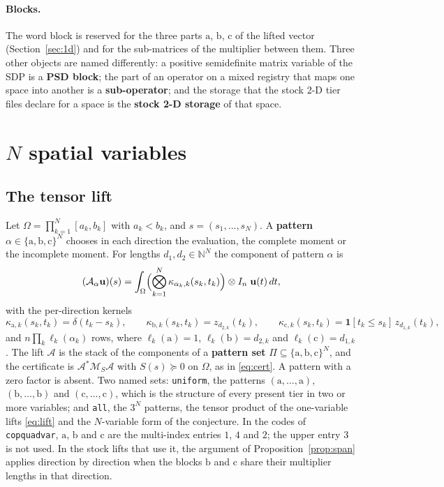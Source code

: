 \documentclass[12pt]{article}
\newcommand{\N}{\mathbb{N}}
\newcommand{\mcl}[1]{\mathcal{#1}}
\newcommand{\mbf}[1]{\mathbf{#1}}
\newcommand{\code}[1]{\texttt{#1}}
\newcommand{\ba}{\mathrm{a}}
\newcommand{\bb}{\mathrm{b}}
\newcommand{\bc}{\mathrm{c}}
\theoremstyle{plain}
\theoremstyle{definition}
\theoremstyle{remark}
\begin{document}
\paragraph{Blocks.} The word block is reserved for the three parts $\ba$, $\bb$, $\bc$ of the lifted vector (Section~\ref{sec:1d}) and for the sub-matrices of the multiplier between them. Three other objects are named differently: a positive semidefinite matrix variable of the SDP is a \textbf{PSD block}; the part of an operator on a mixed registry that maps one space into another is a \textbf{sub-operator}; and the storage that the stock 2-D tier files declare for a space is the \textbf{stock 2-D storage} of that space.

\section{$N$ spatial variables}\label{sec:nd}

\subsection{The tensor lift}\label{sec:tensor}

Let $\Omega=\prod_{k=1}^N[a_k,b_k]$ with $a_k<b_k$, and $s=(s_1,\dots,s_N)$. A \textbf{pattern} $\alpha\in\{\ba,\bb,\bc\}^N$ chooses in each direction the evaluation, the complete moment or the incomplete moment. For lengths $d_1,d_2\in\N^N$ the component of pattern $\alpha$ is
\begin{equation}\label{eq:comp}
(\mcl A_\alpha\mbf u)(s)=\int_\Omega\Bigl(\bigotimes_{k=1}^N\kappa_{\alpha_k,k}(s_k,t_k)\Bigr)\otimes I_n\;\mbf u(t)\,dt,
\end{equation}
with the per-direction kernels
\[
\kappa_{\ba,k}(s_k,t_k)=\delta(t_k-s_k),\qquad \kappa_{\bb,k}(s_k,t_k)=z_{d_{2,k}}(t_k),\qquad \kappa_{\bc,k}(s_k,t_k)=\mathbf 1[t_k\le s_k]\,z_{d_{1,k}}(t_k),
\]
and $n\prod_k\ell_k(\alpha_k)$ rows, where $\ell_k(\ba)=1$, $\ell_k(\bb)=d_{2,k}$ and $\ell_k(\bc)=d_{1,k}$. The lift $\mcl A$ is the stack of the components of a \textbf{pattern set} $\Pi\subseteq\{\ba,\bb,\bc\}^N$, and the certificate is $\mcl A^*\mcl M_S\mcl A$ with $S(s)\succeq0$ on $\Omega$, as in \eqref{eq:cert}. A pattern with a zero factor is absent. Two named sets: \code{uniform}, the patterns $(\ba,\dots,\ba)$, $(\bb,\dots,\bb)$ and $(\bc,\dots,\bc)$, which is the structure of every present tier in two or more variables; and \code{all}, the $3^N$ patterns, the tensor product of the one-variable lifts \eqref{eq:lift} and the $N$-variable form of the conjecture. In the codes of \code{copquadvar}, $\ba$, $\bb$ and $\bc$ are the multi-index entries $1$, $4$ and $2$; the upper entry $3$ is not used. In the stock lifts that use it, the argument of Proposition~\ref{prop:span} applies direction by direction when the blocks $\bb$ and $\bc$ share their multiplier lengths in that direction.
\end{document}
